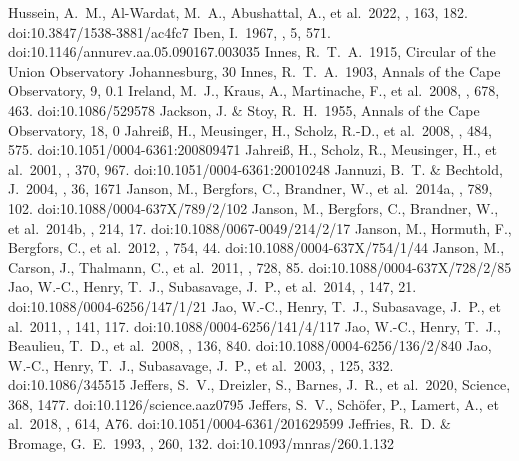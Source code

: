 \documentclass[twocolumn,tighten,twocolappendix]{aastex631}
\begin{document}
\begin{thebibliography}{}
 Hussein, A.~M., Al-Wardat, M.~A., Abushattal, A., et al.\ 2022, \aj, 163, 182. doi:10.3847/1538-3881/ac4fc7
 Iben, I.\ 1967, \araa, 5, 571. doi:10.1146/annurev.aa.05.090167.003035
 Innes, R.~T.~A.\ 1915, Circular of the Union Observatory Johannesburg, 30
 Innes, R.~T.~A.\ 1903, Annals of the Cape Observatory, 9, 0.1
 Ireland, M.~J., Kraus, A., Martinache, F., et al.\ 2008, \apj, 678, 463. doi:10.1086/529578
 Jackson, J. \& Stoy, R.~H.\ 1955, Annals of the Cape Observatory, 18, 0
 Jahrei{\ss}, H., Meusinger, H., Scholz, R.-D., et al.\ 2008, \aap, 484, 575. doi:10.1051/0004-6361:200809471
 Jahrei{\ss}, H., Scholz, R., Meusinger, H., et al.\ 2001, \aap, 370, 967. doi:10.1051/0004-6361:20010248
 Jannuzi, B.~T. \& Bechtold, J.\ 2004, \baas, 36, 1671
 Janson, M., Bergfors, C., Brandner, W., et al.\ 2014a, \apj, 789, 102. doi:10.1088/0004-637X/789/2/102
 Janson, M., Bergfors, C., Brandner, W., et al.\ 2014b, \apjs, 214, 17. doi:10.1088/0067-0049/214/2/17
 Janson, M., Hormuth, F., Bergfors, C., et al.\ 2012, \apj, 754, 44. doi:10.1088/0004-637X/754/1/44
 Janson, M., Carson, J., Thalmann, C., et al.\ 2011, \apj, 728, 85. doi:10.1088/0004-637X/728/2/85
 Jao, W.-C., Henry, T.~J., Subasavage, J.~P., et al.\ 2014, \aj, 147, 21. doi:10.1088/0004-6256/147/1/21
 Jao, W.-C., Henry, T.~J., Subasavage, J.~P., et al.\ 2011, \aj, 141, 117. doi:10.1088/0004-6256/141/4/117
 Jao, W.-C., Henry, T.~J., Beaulieu, T.~D., et al.\ 2008, \aj, 136, 840. doi:10.1088/0004-6256/136/2/840
 Jao, W.-C., Henry, T.~J., Subasavage, J.~P., et al.\ 2003, \aj, 125, 332. doi:10.1086/345515
 Jeffers, S.~V., Dreizler, S., Barnes, J.~R., et al.\ 2020, Science, 368, 1477. doi:10.1126/science.aaz0795
 Jeffers, S.~V., Sch{\"o}fer, P., Lamert, A., et al.\ 2018, \aap, 614, A76. doi:10.1051/0004-6361/201629599
 Jeffries, R.~D. \& Bromage, G.~E.\ 1993, \mnras, 260, 132. doi:10.1093/mnras/260.1.132

\end{thebibliography}
\end{document}
